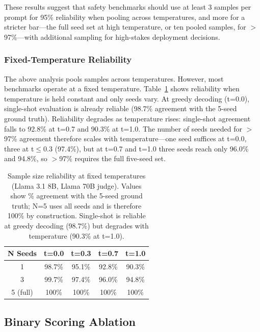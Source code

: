 \documentclass[11pt]{article}
\begin{document}
These results suggest that safety benchmarks should use at least 3 samples per prompt for 95\% reliability when pooling across temperatures, and more for a stricter bar---the full seed set at high temperature, or ten pooled samples, for $>$97\%---with additional sampling for high-stakes deployment decisions.

\subsubsection{Fixed-Temperature Reliability}

The above analysis pools samples across temperatures. However, most benchmarks operate at a fixed temperature. Table~\ref{tab:fixed_temp_sample_size} shows reliability when temperature is held constant and only seeds vary. At greedy decoding (t=0.0), single-shot evaluation is already reliable (98.7\% agreement with the 5-seed ground truth). Reliability degrades as temperature rises: single-shot agreement falls to 92.8\% at t=0.7 and 90.3\% at t=1.0. The number of seeds needed for $>$97\% agreement therefore scales with temperature---one seed suffices at t=0.0, three at t$\leq$0.3 (97.4\%), but at t=0.7 and t=1.0 three seeds reach only 96.0\% and 94.8\%, so $>$97\% requires the full five-seed set.

\begin{table}[h]
\centering
\caption{Sample size reliability at fixed temperatures (Llama 3.1 8B, Llama 70B judge). Values show \% agreement with the 5-seed ground truth; N=5 uses all seeds and is therefore 100\% by construction. Single-shot is reliable at greedy decoding (98.7\%) but degrades with temperature (90.3\% at t=1.0).}
\label{tab:fixed_temp_sample_size}
\begin{tabular}{ccccc}
\toprule
\textbf{N Seeds} & \textbf{t=0.0} & \textbf{t=0.3} & \textbf{t=0.7} & \textbf{t=1.0} \\
\midrule
1 & 98.7\% & 95.1\% & 92.8\% & 90.3\% \\
3 & 99.7\% & 97.4\% & 96.0\% & 94.8\% \\
5 (full) & 100\% & 100\% & 100\% & 100\% \\
\bottomrule
\end{tabular}
\end{table}

\subsection{Binary Scoring Ablation}
\end{document}
